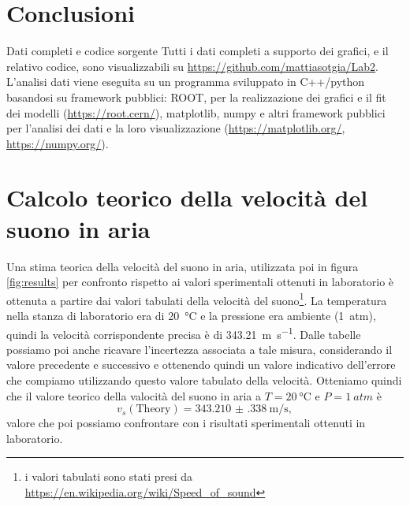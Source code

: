 \documentclass[
    rmp,
    reprint, 
    superscriptaddress, 
    altaffilletter, 
    amsmath, 
    amssymb, 
    a4paper,
    varvw]{revtex4-2}
\begin{document}
\iffalse
\fi

\section{Conclusioni}



\begin{methods}{D\lowercase{ati completi e codice sorgente}}
    Tutti i dati completi a supporto dei grafici, e il relativo codice, sono visualizzabili su \url{https://github.com/mattiasotgia/Lab2}. L'analisi dati viene eseguita su un programma sviluppato in C++/python basandosi su framework pubblici: ROOT, per la realizzazione dei grafici e il fit dei modelli (\url{https://root.cern/}), matplotlib, numpy e altri framework pubblici per l'analisi dei dati e la loro visualizzazione (\url{https://matplotlib.org/}, \url{https://numpy.org/}).
\end{methods}

\appendix

\section{Calcolo teorico della velocità del suono in aria}
Una stima teorica della velocità del suono in aria, utilizzata poi in figura \ref{fig:results} per confronto rispetto ai valori sperimentali ottenuti in laboratorio è ottenuta a partire dai valori tabulati della velocità del suono\footnote{i valori tabulati sono stati presi da \url{https://en.wikipedia.org/wiki/Speed_of_sound}}. La temperatura nella stanza di laboratorio era di \SI{20}{\celsius} e la pressione era ambiente (\SI{1}{atm}), quindi la velocità corrispondente precisa è di \SI{343.21}{\metre\per\second}. Dalle tabelle possiamo poi anche ricavare l'incertezza associata a tale misura, considerando il valore precedente e successivo e ottenendo quindi un valore indicativo dell'errore che compiamo utilizzando questo valore tabulato della velocità. Otteniamo quindi che il valore teorico della valocità del suono in aria a $T=\SI{20}{\celsius}$ e $P=\SI{1}{atm}$ è \[v_s(\text{Theory}) = \SI{343.210(338)}{\metre\per\second},\] valore che poi possiamo confrontare con i risultati sperimentali ottenuti in laboratorio. 

\setcounter{table}{0}
\renewcommand{\thetable}{A-\Roman{table}}
\end{document}
